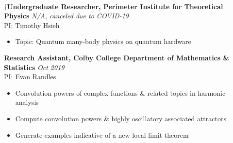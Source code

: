 \documentclass[letter, 10pt]{article}
\newcommand{\longunderline}[1]{\uline{#1\hfill\mbox{}}}
\begin{document}
	\vspace{-7pt}
	\noindent \longunderline{\normalsize{{}}}
	\\ \vspace{-7pt}
	
	\noindent $\dagger$\textbf{Undergraduate Researcher, Perimeter Institute for Theoretical Physics} \hfill \textit{N/A},
	\textit{canceled due to COVID-19}\\
	\noindent PI: Timothy Hsieh
	\begin{itemize}[noitemsep, nolistsep]
		\item Topic: Quantum many-body physics on quantum hardware
	\end{itemize}
	
	\noindent \textbf{Research Assistant, Colby College Department of Mathematics \& Statistics} \hfill \textit{Oct 2019\textemdash} \\ 
	\noindent PI: {Evan Randles}
	\begin{itemize}[noitemsep, nolistsep]
		\item Convolution powers of complex functions \& related topics in harmonic analysis
		\item Compute convolution powers \& highly oscillatory associated attractors
		\item Generate examples indicative of a new local limit theorem
	\end{itemize}
	
\end{document}

